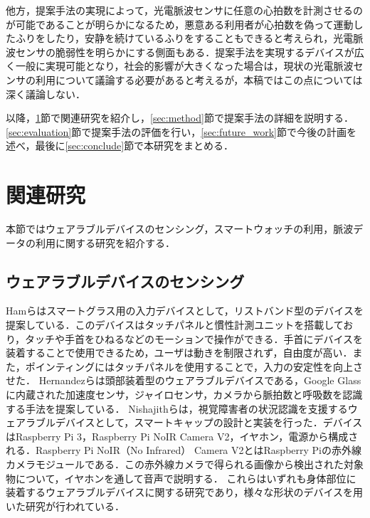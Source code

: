 \documentclass[Japanese,noauthor]{dicomopapers}
\begin{document}
他方，提案手法の実現によって，光電脈波センサに任意の心拍数を計測させるのが可能であることが明らかになるため，悪意ある利用者が心拍数を偽って運動したふりをしたり，安静を続けているふりをすることもできると考えられ，光電脈波センサの脆弱性を明らかにする側面もある．提案手法を実現するデバイスが広く一般に実現可能となり，社会的影響が大きくなった場合は，現状の光電脈波センサの利用について議論する必要があると考えるが，本稿ではこの点については深く議論しない．

以降，\ref{sec:related}節で関連研究を紹介し，\ref{sec:method}節で提案手法の詳細を説明する．\ref{sec:evaluation}節で提案手法の評価を行い，\ref{sec:future_work}節で今後の計画を述べ，最後に\ref{sec:conclude}節で本研究をまとめる．



\section{関連研究}
\label{sec:related}
本節ではウェアラブルデバイスのセンシング，スマートウォッチの利用，脈波データの利用に関する研究を紹介する．

\subsection{ウェアラブルデバイスのセンシング}
Hamら\cite{smart_wristband}はスマートグラス用の入力デバイスとして，リストバンド型のデバイスを提案している．このデバイスはタッチパネルと慣性計測ユニットを搭載しており，タッチや手首をひねるなどのモーションで操作ができる．手首にデバイスを装着することで使用できるため，ユーザは動きを制限されず，自由度が高い．また，ポインティングにはタッチパネルを使用することで，入力の安定性を向上させた．
Hernandezら\cite{bioglass}は頭部装着型のウェアラブルデバイスである，Google Glassに内蔵された加速度センサ，ジャイロセンサ，カメラから脈拍数と呼吸数を認識する手法を提案している．
Nishajithら\cite{smart_cap}は，視覚障害者の状況認識を支援するウェアラブルデバイスとして，スマートキャップの設計と実装を行った．デバイスはRaspberry Pi 3，Raspberry Pi NoIR Camera V2，イヤホン，電源から構成される．Raspberry Pi NoIR（No Infrared） Camera V2とはRaspberry Piの赤外線カメラモジュールである．この赤外線カメラで得られる画像から検出された対象物について，イヤホンを通して音声で説明する．
これらはいずれも身体部位に装着するウェアラブルデバイスに関する研究であり，様々な形状のデバイスを用いた研究が行われている．\par
\end{document}
